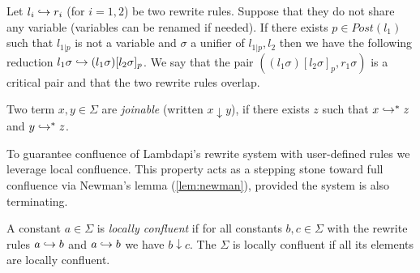 \begin{definition}\label{def:critical-pair}
Let $l_i \hookrightarrow r_i$ (for $i = 1, 2$) be two rewrite rules. Suppose that they do not share any variable (variables can be renamed if needed).
If there exists $p \in Post(l_1)$ such that $l_{1 | p}$ is not a variable and $\sigma$ a unifier of $l_{1 | p}, l_2$ then
we have the following reduction $l_1 \sigma \hookrightarrow (l_1\sigma)[l_2\sigma]_p$. We say that the pair $((l_1\sigma)[l_2\sigma]_p, r_1\sigma)$ is a
critical pair and that the two rewrite rules overlap.
\begin{center}
\end{center}
\end{definition}

\begin{definition}[Joinable]
Two term $x, y \in \Sigma$ are \emph{joinable} (written $x \downarrow y$), if there exists $z$ such that $x \hookrightarrow^* z$ and $y \hookrightarrow^* z$.
\end{definition}

To guarantee confluence of Lambdapi's rewrite system with user-defined rules we leverage local confluence. 
This property acts as a stepping stone toward full confluence via Newman's lemma (\cref{lem:newman}), provided the system is also terminating.

\begin{definition}
A constant $a \in \Sigma$ is \emph{locally confluent} if for all constants $b,c \in \Sigma$ with the rewrite rules $a \hookrightarrow b$ and $a \hookrightarrow b$
we have $b \downarrow c$. The $\Sigma$ is locally confluent if all its elements are locally confluent.
\end{definition}

